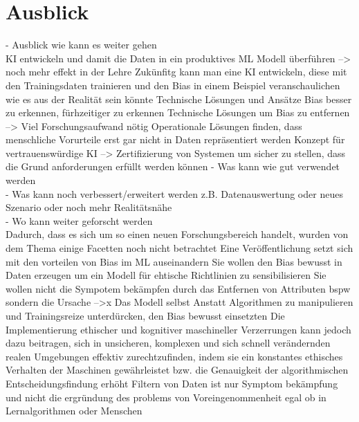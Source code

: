 \section{Ausblick}
\label{ausblick}
- Ausblick wie kann es weiter gehen\\
    KI entwickeln und damit die Daten in ein produktives ML Modell überführen --> noch mehr effekt in der Lehre
    Zukünfitg kann man eine KI entwickeln, diese mit den Trainingsdaten trainieren und den Bias in einem Beispiel veranschaulichen wie es aus der Realität sein könnte
    Technische Lösungen und Ansätze Bias besser zu erkennen, fürhzeitiger zu erkennen 
    Technische Lösungen um Bias zu entfernen --> Viel Forschungsaufwand nötig
    Operationale Lösungen finden, dass menschliche Vorurteile erst gar nicht in Daten repräsentiert werden 
    Konzept für vertrauenswürdige KI --> Zertifizierung von Systemen um sicher zu stellen, dass die Grund anforderungen erfüllt werden können
- Was kann wie gut verwendet werden\\
- Was kann noch verbessert/erweitert werden z.B. Datenauswertung oder neues Szenario oder noch mehr Realitätsnähe\\

- Wo kann weiter geforscht werden\\
    Dadurch, dass es sich um so einen neuen Forschungsbereich handelt, wurden von dem Thema einige Facetten noch nicht betrachtet
    Eine Veröffentlichung setzt sich mit den vorteilen von Bias im ML auseinandern
    Sie wollen den Bias bewusst in Daten erzeugen um ein Modell für ehtische Richtlinien zu sensibilisieren
    Sie wollen nicht die Sympotem bekämpfen durch das Entfernen von Attributen bspw sondern die Ursache -->x Das Modell selbst
    Anstatt Algorithmen zu manipulieren und Trainingsreize unterdürcken, den Bias bewusst einsetzten
    Die Implementierung ethischer und kognitiver maschineller Verzerrungen kann jedoch dazu beitragen, sich in unsicheren, komplexen und sich schnell verändernden realen Umgebungen effektiv zurechtzufinden, indem sie ein konstantes ethisches Verhalten der Maschinen gewährleistet bzw. die Genauigkeit der algorithmischen Entscheidungsfindung erhöht
    Filtern von Daten ist nur Symptom bekämpfung und nicht die ergründung des problems von Voreingenommenheit egal ob in Lernalgorithmen oder Menschen\cite{Fabi2022}
\newpage